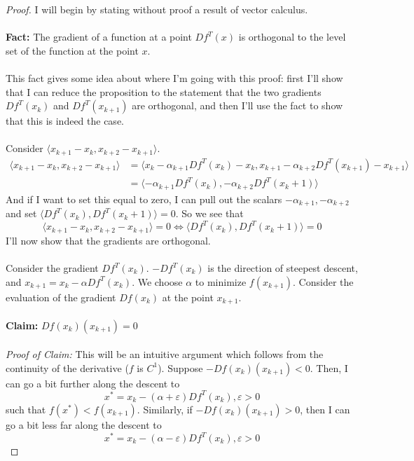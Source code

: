 \documentclass[12pt]{article}
\newenvironment{problem}[2][Problem]{\begin{trivlist}
\item[\hskip \labelsep {\bfseries #1}\hskip \labelsep {\bfseries #2.}]}{\end{trivlist}}
\theoremstyle{definition}
\theoremstyle{definition}
\theoremstyle{definition}
\theoremstyle{definition}
\begin{document}
\begin{problem}{9.5}
\begin{proof}
I will begin by stating without proof a result of vector calculus. \\
\\ 
\textbf{Fact:} The gradient of a function at a point $Df^T(x)$ is orthogonal to the level set of the function at the point $x$. \\
\\
This fact gives some idea about where I'm going with this proof: first I'll show that I can reduce the proposition to the statement that the two gradients $Df^T(x_k)$ and $Df^T(x_{k+1})$ are orthogonal, and then I'll use the fact to show that this is indeed the case. \\
\\
Consider $\langle x_{k+1} - x_{k}, x_{k+2} - x_{k+1} \rangle$.
\begin{align*}
\langle x_{k+1} - x_{k}, x_{k+2} - x_{k+1} \rangle &= \langle x_{k} - \alpha_{k+1} Df^T(x_k) - x_{k}, x_{k+1} - \alpha_{k+2} Df^T(x_{k+1}) - x_{k+1} \rangle \\
&= \langle -\alpha_{k+1} Df^T(x_k), - \alpha_{k+2} Df^T(x_k+1) \rangle
\end{align*}
And if I want to set this equal to zero, I can pull out the scalars $-\alpha_{k+1}, -\alpha_{k+2}$ and set $\langle Df^T(x_k), Df^T(x_k+1) \rangle = 0$. So we see that 
$$
\langle x_{k+1} - x_{k}, x_{k+2} - x_{k+1} \rangle = 0 \iff \langle Df^T(x_k), Df^T(x_k+1) \rangle = 0
$$ 
I'll now show that the gradients are orthogonal. \\
\\
Consider the gradient $Df^T(x_k)$. $-Df^T(x_k)$ is the direction of steepest descent, and $x_{k+1} = x_k - \alpha Df^T(x_k)$. We choose $\alpha$ to minimize $f(x_{k+1})$. Consider the evaluation of the gradient $Df(x_k)$ at the point $x_{k+1}$. \\
\\
\textbf{Claim:} $Df(x_k)(x_{k+1}) = 0$\\
\\
\textit{Proof of Claim:} This will be an intuitive argument which follows from the continuity of the derivative ($f$ is $C^1$). Suppose $-Df(x_k)(x_{k+1}) < 0$. Then, I can go a bit further along the descent to 
$$x^* = x_k - (\alpha + \varepsilon ) Df^T(x_k), \varepsilon > 0$$
such that $f(x^*) < f(x_{k+1})$. Similarly, if $-Df(x_k)(x_{k+1}) > 0$, then I can go a bit less far along the descent to 
$$x^* = x_k - (\alpha - \varepsilon) Df^T(x_k), \varepsilon > 0$$

\end{proof}
\end{problem}
\end{document}
